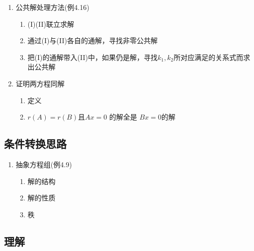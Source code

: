 \documentclass[a4paper,12pt]{article}
\begin{document}
\begin{enumerate}
\begin{enumerate}
            \item 对增广矩阵作初等{\color{red}{行变换}}化为阶梯形矩阵
            \item 求导出组的几个基础解系
            \item 求方程组的一个特解（为简捷，可令自由变量全为0）
            \item 按解的结构写出通解
            \item 注: \textbf{当方程组中含有参数时，分析讨论要严谨不要丢情况}
        \end{enumerate}
        \item 公共解处理方法(例4.16)
        \begin{enumerate}
            \item (I)(II)联立求解
            \item 通过(I)与(II)各自的通解，寻找非零公共解
            \item 把(I)的通解带入(II)中，如果仍是解，寻找$k_1, k_2$所对应满足的关系式而求出公共解
        \end{enumerate}
        \item 证明两方程同解
        \begin{enumerate}
            \item 定义
            \item $r(A) = r(B)$且$Ax = 0$ 的解全是 $Bx = 0$的解
        \end{enumerate}
    \end{enumerate}

    \subsection{条件转换思路}
    \begin{enumerate}
        \item 抽象方程组(例4.9)
        \begin{enumerate}
            \item 解的结构
            \item 解的性质
            \item 秩
        \end{enumerate}
    \end{enumerate}

    \subsection{理解}

    \begin{enumerate}
    \end{enumerate}
\end{document}
